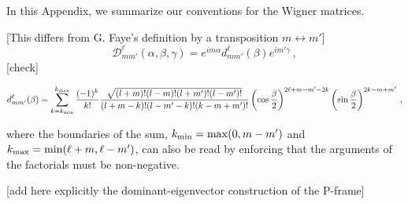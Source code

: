 \documentclass[aps,showpacs,twocolumn,
prd,superscriptaddress,nofootinbib]{revtex4-1}
\newcommand{\be}{\begin{equation}}
\newcommand{\ee}{\end{equation}}
\newcommand\calD{{\mathcal{D}}}
\newcommand{\SM}[1]{{\color{Red} #1}}
\begin{document}
In this Appendix, we summarize our conventions for the Wigner matrices.

\SM{[This differs from G. Faye's definition by a transposition $m\leftrightarrow m'$]}
\be\label{eq:defWignerDapp}
	\calD^{\ell}_{mm'} (\alpha, \beta, \gamma) = e^{im \alpha} d^{\ell}_{mm'}(\beta) e^{im' \gamma}\,,
\ee
\SM{[check]}
\begin{widetext}
\be\label{eq:defWignerdapp}
	d^{\ell}_{mm'}(\beta) = \sum\limits_{k=k_{\rm min}}^{k_{\rm max}} \frac{(-1)^{k}}{k!} \frac{\sqrt{(l+m)! (l-m)! (l+m')! (l-m')!}}{(l+m-k)! (l-m'-k)! (k-m+m')!} \left( \cos\frac{\beta}{2} \right)^{2\ell+m-m'-2k} \left( \sin\frac{\beta}{2} \right)^{2k-m+m'}\,,
\ee
\end{widetext}
where the boundaries of the sum, $k_{\rm min} = \mathrm{max}(0, m-m')$ and $k_{\rm max} = \mathrm{min}(\ell+m, \ell-m')$, can also be read by enforcing that the arguments of the factorials must be non-negative.

\SM{[add here explicitly the dominant-eigenvector construction of the P-frame]}



%

\end{document}
